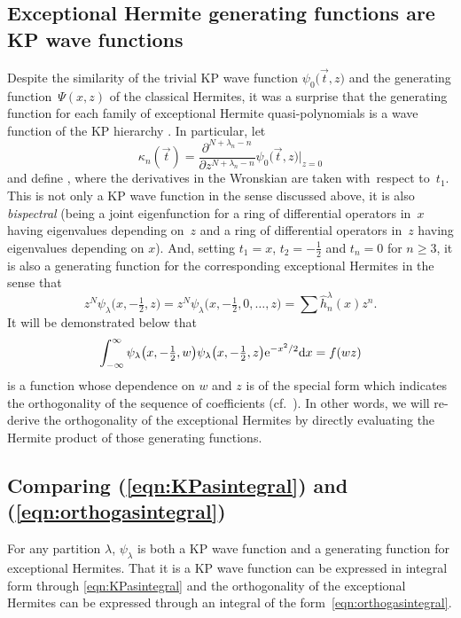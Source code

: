 \documentclass[10pt,a4paper]{amsart}
\numberwithin{equation}{section}
\theoremstyle{definition}
\def\vt{\vec{t}}
\begin{document}
\subsection{Exceptional Hermite generating functions are KP
 wave functions}\label{sec:xingrad}

Despite the similarity of the trivial KP wave function $\psi_0\bigl(\vt,z\bigr)$ and the
generating function~$\Psi(x,z)$ of the classical Hermites,
 it was a surprise that the generating function for each family of
exceptional Hermite quasi-polynomials is a wave function of the KP
hierarchy \cite{KasMil}. In particular, let
\[
\kappa_n(\vt)=\frac{\partial^{N+\lambda_n-n}}{\partial
 z^{N+\lambda_n-n}}\psi_0\bigl(\vt,z\bigr)\bigg|_{z=0}
\]
and define
\smash{$
\psi_{\lambda}\bigl(\vt,z\bigr)=\frac{\hbox{Wr}(\kappa_1,\ldots,\kappa_N,\psi_0)}{z^N\hbox{Wr}(\kappa_1,\ldots,\kappa_N)}$},
where the derivatives in the Wronskian are taken with~respect to~$t_1$.
This is not only a KP wave function in the sense discussed above, it
is also \textit{bispectral} (being a joint eigenfunction for a ring of
differential operators in~$x$ having eigenvalues depending on~$z$ and
a ring of differential operators in~$z$ having eigenvalues depending
on $x$). And, setting $t_1=x$, $t_2=-\tfrac{1}{2}$ and $t_n=0$ for $n\geq3$, it
is also a generating function for the corresponding
exceptional Hermites in the sense that
\[
z^N\psi_{\lambda}\bigl(x,-\tfrac{1}{2},z\bigr)=z^N\psi_{\lambda}\bigl(x,-\tfrac{1}{2},0,\ldots,z\bigr)=\sum \hat h^{\lambda}_n(x)z^n.
\]
 It will be demonstrated below that
 \begin{equation}
 \label{eqn:orthogasintegral}
\int_{-\infty}^{\infty}\psi_{\lambda}\bigl(x,-\tfrac{1}{2},w\bigr)
 \psi_{\lambda}\bigl(x,-\tfrac{1}{2},z\bigr){\rm e}^{-x^2/2}{\rm d}x
 =f(wz)
 \end{equation}
 is a function whose dependence on $w$ and $z$ is of the special form
 which indicates the orthogonality of the sequence of coefficients
 (cf.~\cite{twofacts}). In
 other words, we will re-derive the orthogonality of the exceptional
 Hermites by directly evaluating the Hermite product of those generating
 functions.

 \subsection{Comparing (\ref{eqn:KPasintegral}) and
 (\ref{eqn:orthogasintegral})}

For any partition $\lambda$, $\psi _{\lambda}$ is
both a KP wave function and a generating function for exceptional
Hermites. That it is a KP wave function can be expressed in integral
form through \eqref{eqn:KPasintegral} and the orthogonality of the
exceptional Hermites can be expressed through an integral of the form~\eqref{eqn:orthogasintegral}.
\end{document}
